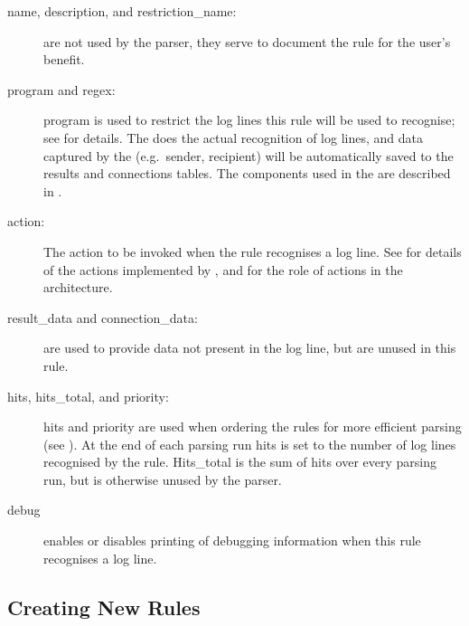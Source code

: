 \begin{description}

    \item [name, description, and restriction\_name:] are not used by the
        parser, they serve to document the rule for the user's benefit.

    \item [program and regex:] program is used to restrict the log lines
        this rule will be used to recognise; see  for details.  The 
        does the actual recognition of log lines, and data captured by the
         (e.g.\ sender, recipient) will be automatically
        saved to the results and connections tables.  The 
        components used in the  are described in
        .

    \item [action:] The action to be invoked when the rule recognises a log
        line.  See  for
        details of the actions implemented by \parsername{}, and
         for the role of actions in the
        architecture.

    \item [result\_data and connection\_data:] are used to provide data not
        present in the log line, but are unused in this rule.

    \item [hits, hits\_total, and priority:] hits and priority are used
        when ordering the rules for more efficient parsing (see
        ).  At the end of each
        parsing run hits is set to the number of log lines recognised by
        the rule.  Hits\_total is the sum of hits over every parsing run,
        but is otherwise unused by the parser.

    \item [debug] enables or disables printing of debugging information
        when this rule recognises a log line.

\end{description}

\subsection{Creating New Rules}

\label{creating new rules in implementation}

